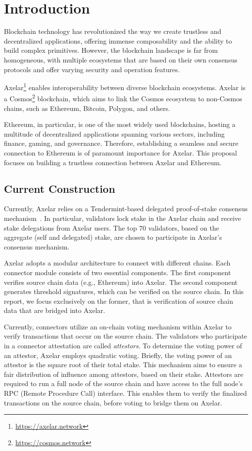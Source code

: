 \section{Introduction}
Blockchain technology has revolutionized the way we create trustless and decentralized applications, offering immense composability and the ability to build complex primitives. However, the blockchain landscape is far from homogeneous, with multiple ecosystems that are based on their own consensus protocols and offer varying security and operation features. 

Axelar\footnote{\url{https://axelar.network}} enables interoperability between diverse blockchain ecosystems. Axelar is a Cosmos\footnote{\url{https://cosmos.network}} blockchain, which aims to link the Cosmos ecosystem to non-Cosmos chains, such as Ethereum, Bitcoin, Polygon, and others.

Ethereum, in particular, is one of the most widely used blockchains, hosting a multitude of decentralized applications spanning various sectors, including finance, gaming, and governance\cite{wood,buterin}. Therefore, establishing a seamless and secure connection to Ethereum is of paramount importance for Axelar. This proposal focuses on building a trustless connection between Axelar and Ethereum.

\subsection{Current Construction}
Currently, Axelar relies on a Tendermint-based delegated proof-of-stake consensus mechanism~\cite{axelar-whitepaper,buchman2019latest}. In particular, validators lock stake in the Axelar chain and receive stake delegations from Axelar users. The top $70$ validators, based on the aggregate (self and delegated) stake, are chosen to participate in Axelar's consensus mechanism.

Axelar adopts a modular architecture to connect with different chains. Each connector module consists of two essential components. The first component verifies source chain data (e.g., Ethereum) into Axelar. The second component generates threshold signatures, which can be verified on the source chain. In this report, we focus exclusively on the former, that is verification of source chain data that are bridged into Axelar.

Currently, connectors utilize an on-chain voting mechanism within Axelar to verify transactions that occur on the source chain. The validators who participate in a connector attestation are called \emph{attestors}. To determine the voting power of an attestor, Axelar employs quadratic voting. Briefly, the voting power of an attestor is the square root of their total stake. This mechanism aims to ensure a fair distribution of influence among attestors, based on their stake. Attestors are required to run a full node of the source chain and have access to the full node's RPC (Remote Procedure Call) interface. This enables them to verify the finalized transactions on the source chain, before voting to bridge them on Axelar.

